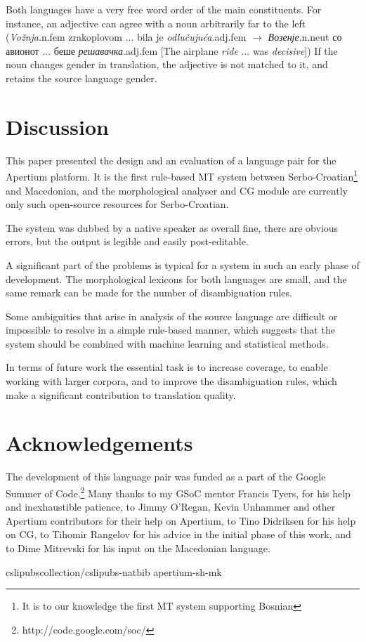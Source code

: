 \documentclass{book}
\begin{document}
Both languages have a very free word order of the main constituents. For instance, an 
adjective can agree with a noun arbitrarily far to the left
(\emph{Vožnja}{\sc.n.fem} zrakoplovom ... bila je \emph{odlučujuća}{\sc.adj.fem} $\rightarrow$ \emph{Возенје}{\sc.n.neut} со авионот ... беше \emph{решавачка}{\sc.adj.fem}  [The airplane \emph{ride} ... was \emph{decisive}])
If the noun 
changes gender in translation, the adjective is not matched to it, and retains
the source language gender.

\section{Discussion}
This paper presented the design and an evaluation of a language pair for the Apertium platform.
It is the first rule-based MT system between Serbo-Croatian\footnote{It is to our knowledge the first 
MT system supporting Bosnian} and Macedonian, and the morphological
analyser and CG module are currently only such open-source resources for Serbo-Croatian.

The system was dubbed by a native speaker as overall fine, there are obvious errors, but the output is legible and easily post-editable. 

A significant part of the problems is typical for a system in such an early phase of 
development. The morphological lexicons for both languages are small, and 
the same remark can be made for the number of disambiguation rules. 

Some ambiguities that arise in analysis of the source language are 
difficult or impossible to resolve in a simple rule-based manner, which suggests that 
the system should be combined with machine learning and statistical methods.

In terms of future work the essential task is to increase coverage, to enable working
with larger corpora, and to improve the disambiguation rules, which make a significant
contribution to translation quality.

\section*{Acknowledgements}
The development of this language pair was funded as a part of the 
Google Summer of Code.\footnote{http://code.google.com/soc/}
Many thanks to my GSoC mentor Francis Tyers, for his help and inexhaustible
patience, to Jimmy O'Regan, Kevin Unhammer and other Apertium contributors for
their help on Apertium, to Tino Didriksen for his help on CG, to Tihomir Rangelov
for his advice in the initial phase of this work, and to Dime Mitrevski
for his input on the Macedonian language.

 {cslipubscollection/cslipubs-natbib}
 {apertium-sh-mk}

\backmatter
\end{document}
